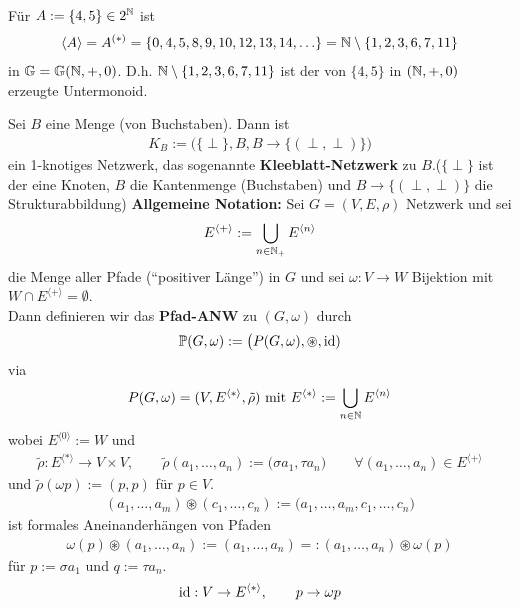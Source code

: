 \begin{beispiel}
Für $A:=\lbrace 4,5\rbrace\in 2^{\mathbb{N}}$ ist 
\begin{align*}
\langle A\rangle=A^{(\ast)}=\lbrace0,4,5,8,9,10,12,13,14,\ldots\rbrace=\mathbb{N}\setminus\lbrace1,2,3,6,7,11\rbrace
\end{align*}
in $\mathbb{G}=\mathbb{G}(\mathbb{N},+,0)$. D.h. $\mathbb{N}\setminus\lbrace1,2,3,6,7,11\rbrace$ ist der von $\lbrace4,5\rbrace$ in $(\mathbb{N},+,0)$ erzeugte Untermonoid.
\end{beispiel}

Sei $B$ eine Menge (von Buchstaben). Dann ist 
\begin{align*}
K_B:=\big(\lbrace\perp\rbrace,B,B\to\lbrace(\perp,\perp)\rbrace\Big)
\end{align*}
ein 1-knotiges Netzwerk, das sogenannte \textbf{Kleeblatt-Netzwerk} zu $B$.($\lbrace\perp\rbrace$ ist der eine Knoten, $B$ die Kantenmenge (Buchstaben) und $B\to\lbrace(\perp,\perp)\rbrace$ die Strukturabbildung)\nl
\textbf{Allgemeine Notation:} Sei $G=(V,E,\rho)$ Netzwerk und sei
\begin{align*}
E^{\langle+\rangle}:=\bigcup\limits_{n\in\mathbb{N}_+} E^{\langle n\rangle}
\end{align*}
die Menge aller Pfade (``positiver Länge'') in $G$ und sei $\omega:V\to W$ Bijektion mit $W\cap E^{\langle +\rangle}=\emptyset$.\\
Dann definieren wir das \textbf{Pfad-ANW} zu $(G,\omega)$ durch
\begin{align*}
\mathbb{P}(G,\omega):=\big(P(G,\omega),\circledast,\text{id})
\end{align*}
via
\begin{align*}
P(G,\omega)=(V,E^{\langle\ast\rangle},\tilde{\rho})\text{ mit } E^{\langle\ast\rangle}:=\bigcup\limits_{n\in\mathbb{N}} E^{\langle n\rangle}
\end{align*}
wobei $E^{\langle0\rangle}:=W$ und
\begin{align*}
\tilde{\rho}:E^{\langle\ast\rangle}\to V\times V,\qquad\tilde{\rho}(a_1,\ldots,a_n):=\big(\sigma a_1,\tau a_n\big)
\qquad\forall(a_1,\ldots,a_n)\in E^{\langle+\rangle}
\end{align*}
und $\tilde{\rho}(\omega p):=(p,p)$ für $p\in V$.
\begin{align*}
(a_1,\ldots,a_m)\circledast(c_1,\ldots,c_n)
:=\big(a_1,\ldots,a_m,c_1,\ldots, c_n\big)
\end{align*}
ist formales Aneinanderhängen von Pfaden 
\begin{align*}
\omega(p)\circledast(a_1,\ldots,a_n):=(a_1,\ldots,a_n)=:(a_1,\ldots,a_n)\circledast\omega(p)
\end{align*}
für $p:=\sigma a_1$ und $q:=\tau a_n$.
\begin{align*}
\text{id}:V\to E^{\langle\ast\rangle},\qquad p\to\omega p
\end{align*}

